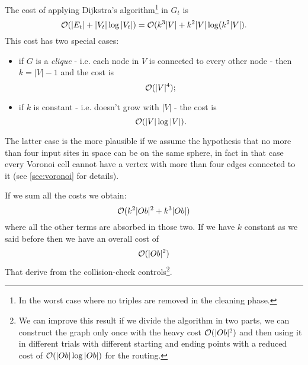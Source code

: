 \documentclass[dissertation.tex]{subfiles}
\begin{document}
The cost of applying Dijkstra's algorithm\footnote{In the worst case
  where no triples are removed in the cleaning phase.} in $G_t$ is
\newcommand{\eqCostDijkstraTriples}{\ensuremath{\bigO(k^3|V|+k^2|V|\log(k^2|V|)}}
\begin{equation}
  \label{eq:costDijkstraTriples}
  \bigO(|E_t|+|V_t|\log |V_t|) = \eqCostDijkstraTriples .
\end{equation}
This cost has two special cases:
\begin{itemize}
\item if $G$ is a \emph{clique} - i.e. each
  node in $V$ is connected to every other node \cite{bondy} - then
  $k=|V|-1$ and the cost is
  \begin{equation*}
    \mathcal{O}(|V|^4);
  \end{equation*}
\item if $k$ is constant - i.e. doesn't grow with $|V|$ - the
  cost is
  \begin{equation*}
    \mathcal{O}(|V|\log|V|).
  \end{equation*}
\end{itemize}
The latter case is the more plausible if we assume the hypothesis that
no more than four input sites in space can be on the
same sphere, in fact in that case
every Voronoi cell cannot have a vertex with more than four edges
connected to it (see \cref{sec:voronoi} for details).

If we sum all the costs we obtain:
\newcommand{\eqCostTotalOne}{\ensuremath{\bigO(k^2|Ob|^2+k^3|Ob|)}}
\begin{equation}\label{eq:costTotalOne}
  \eqCostTotalOne
\end{equation}
where all the other terms are absorbed in those two. If we have $k$
constant as we said before then we have an overall cost of
\newcommand{\eqCostTotalOneK}{\ensuremath{\bigO(|Ob|^2)}}
\begin{equation}\label{eq:costTotalOneK}
  \eqCostTotalOneK
\end{equation}
That derive from the collision-check controls\footnote{We can improve
  this result if we divide the algorithm in two parts, we 
can construct the graph only once with the heavy cost $\mathcal{O}(|Ob|^2)$
and then using
it in different trials with different starting and ending points with
a reduced cost of $\mathcal{O}(|Ob|\log |Ob|)$
for the routing.}.
\end{document}
